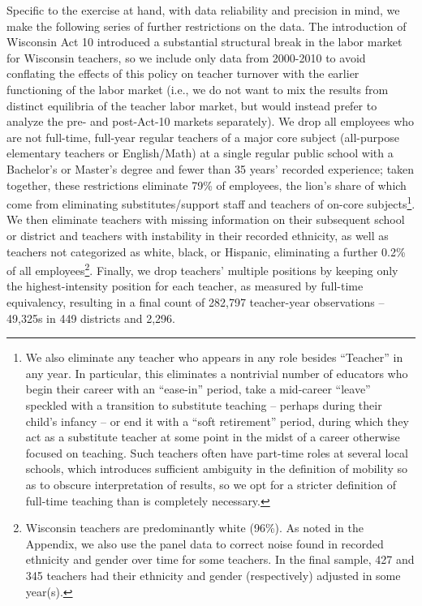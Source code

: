 \documentclass[12pt,]{article}
\let\rmarkdownfootnote\footnote%
\def\footnote{\protect\rmarkdownfootnote}
\begin{document}
Specific to the exercise at hand, with data reliability and precision in
mind, we make the following series of further restrictions on the data.
The introduction of Wisconsin Act 10 introduced a substantial structural
break in the labor market for Wisconsin teachers, so we include only
data from 2000-2010 to avoid conflating the effects of this policy on
teacher turnover with the earlier functioning of the labor market (i.e.,
we do not want to mix the results from distinct equilibria of the
teacher labor market, but would instead prefer to analyze the pre- and
post-Act-10 markets separately). We drop all employees who are not
full-time, full-year regular teachers of a major core subject
(all-purpose elementary teachers or English/Math) at a single regular
public school with a Bachelor's or Master's degree and fewer than 35
years' recorded experience; taken together, these restrictions eliminate
79\% of employees, the lion's share of which come from eliminating
substitutes/support staff and teachers of on-core subjects\footnote{\label{ftn:pos_code}We
  also eliminate any teacher who appears in any role besides ``Teacher''
  in any year. In particular, this eliminates a nontrivial number of
  educators who begin their career with an ``ease-in'' period, take a
  mid-career ``leave'' speckled with a transition to substitute teaching
  -- perhaps during their child's infancy -- or end it with a ``soft
  retirement'' period, during which they act as a substitute teacher at
  some point in the midst of a career otherwise focused on teaching.
  Such teachers often have part-time roles at several local schools,
  which introduces sufficient ambiguity in the definition of mobility so
  as to obscure interpretation of results, so we opt for a stricter
  definition of full-time teaching than is completely necessary.}. We
then eliminate teachers with missing information on their subsequent
school or district and teachers with instability in their recorded
ethnicity, as well as teachers not categorized as white, black, or
Hispanic, eliminating a further 0.2\% of all employees\footnote{Wisconsin
  teachers are predominantly white (96\%). As noted in the Appendix, we
  also use the panel data to correct noise found in recorded ethnicity
  and gender over time for some teachers. In the final sample, 427 and
  345 teachers had their ethnicity and gender (respectively) adjusted in
  some year(s).}. Finally, we drop teachers' multiple positions by
keeping only the highest-intensity position for each teacher, as
measured by full-time equivalency, resulting in a final count of 282,797
teacher-year observations -- 49,325s in 449 districts and 2,296.
\end{document}

